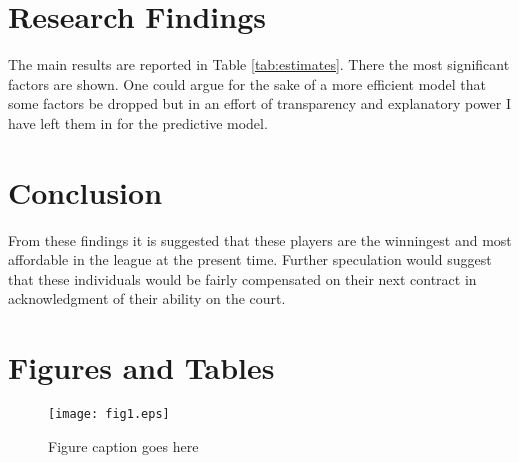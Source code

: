 \documentclass[12pt,english]{article}
\begin{document}
\section{Research Findings}\label{sec:results}
The main results are reported in Table \ref{tab:estimates}. There the most significant factors are shown. One could argue for the sake of a more efficient model that some factors be dropped but in an effort of transparency and explanatory power I have left them in for the predictive model.



\section{Conclusion}\label{sec:conclusion}
From these findings it is suggested that these players are the winningest and most affordable in the league at the present time. Further speculation would suggest that these individuals would be fairly compensated on their next contract in acknowledgment of their ability on the court.


\vfill
\pagebreak{}
\begin{spacing}{1.0}


\end{spacing}

\vfill
\pagebreak{}
\clearpage

\section*{Figures and Tables}\label{sec:figTables}
\begin{figure}[ht]
\centering
\bigskip{}
\texttt{[image: fig1.eps]}
\caption{Figure caption goes here}
\label{fig:fig1}
\end{figure}
\end{document}

